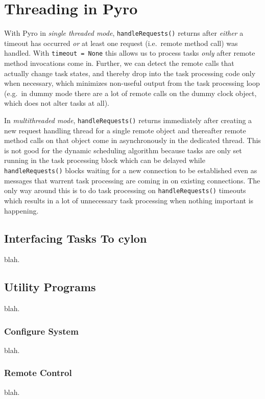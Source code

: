 \documentclass[11pt,a4paper]{article}
\begin{document}
\section{Threading in Pyro} \label{pyro-appendix}

With Pyro in {\em single threaded mode}, \verb#handleRequests()# returns
after {\em either} a timeout has occurred {\em or} at least one request
(i.e.\ remote method call) was handled. With \verb#timeout = None# this
allows us to process tasks {\em only} after remote method invocations
come in.  Further, we can detect the remote calls that actually change
task states, and thereby drop into the task processing code only when
necessary, which minimizes non-useful output from the task processing
loop (e.g.\ in dummy mode there are a lot of remote calls on the dummy
clock object, which does not alter tasks at all). 

In {\em multithreaded mode}, \verb#handleRequests()# returns immediately
after creating a new request handling thread for a single remote object
and thereafter remote method calls on that object come in asynchronously
in the dedicated thread. This is not good for the dynamic scheduling
algorithm because tasks are only set running in the task processing
block which can be delayed while \verb#handleRequests()# blocks waiting
for a new connection to be established even as messages that warrent
task processing are coming in on existing connections. The only way
around this is to do task processing on \verb#handleRequests()# timeouts
which results in a lot of unnecessary task processing when nothing
important is happening.


\subsection{Interfacing Tasks To cylon}
blah.

\subsection{Utility Programs}
blah.

\subsubsection{Configure System}
blah.

\subsubsection{Remote Control}
blah.
\end{document}
